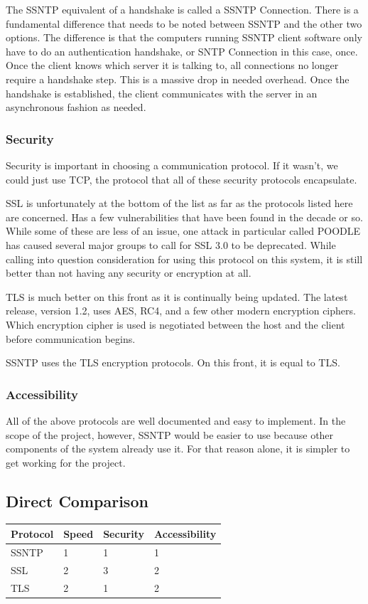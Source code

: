 \documentclass[10pt,letterpaper,onecolumn,draftclsnofoot]{IEEEtran}
\begin{document}
The SSNTP equivalent of a handshake is called a SSNTP Connection. There is a
fundamental difference that needs to be noted between SSNTP and the other two
options. The difference is that the computers running SSNTP client software
only have to do an authentication handshake, or SNTP Connection in this case,
once. Once the client knows which server it is talking to, all connections
no longer require a handshake step. This is a massive drop in needed overhead.
\cite{ssntp} Once the handshake is established, the client communicates with
the server in an asynchronous fashion as needed.

\subsubsection{Security}
Security is important in choosing a communication protocol. If it wasn't, we
could just use TCP, the protocol that all of these security protocols
encapsulate.

SSL is unfortunately at the bottom of the list as far as the
protocols listed here are concerned. Has a few vulnerabilities that have been
found in the decade or so. While some of these are less of an issue, one attack
in particular called POODLE has caused several major groups to call for SSL 3.0
to be deprecated.\cite{poodle} While calling into question consideration for
using this protocol on this system, it is still better than not having any
security or encryption at all.

TLS is much better on this front as it is continually being updated. The latest
release, version 1.2, uses AES, RC4, and a few other modern encryption ciphers.
\cite{tls} Which encryption cipher is used is negotiated between the host and
the client before communication begins.

SSNTP uses the TLS encryption protocols. On this front, it is equal to TLS.

\subsubsection{Accessibility}
All of the above protocols are well documented and easy to implement. In the
scope of the project, however, SSNTP would be easier to use because other
components of the system already use it. For that reason alone, it is simpler
to get working for the project.

\subsection{Direct Comparison}
\begin{center}
	\begin{tabular}{| l | l | l | l |}
		\hline
		Protocol & Speed & Security & Accessibility \\ \hline
		SSNTP & 1 & 1 & 1 \\ \hline
		SSL & 2 & 3 & 2 \\ \hline
		TLS & 2 & 1 & 2 \\ \hline
	\end{tabular}
\end{center}
\end{document}
